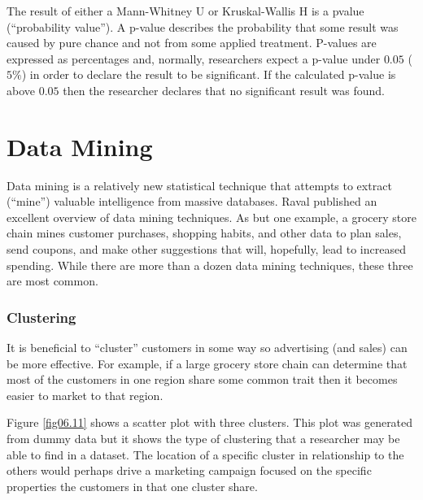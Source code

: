 The result of either a Mann-Whitney U or Kruskal-Wallis H is a \gls{pvalue} (``probability value''). A p-value describes the probability that some result was caused by pure chance and not from some applied treatment. P-values are expressed as percentages and, normally, researchers expect a p-value under $ 0.05 $ ($ 5\% $) in order to declare the result to be significant. If the calculated p-value is above $ 0.05 $ then the researcher declares that no significant result was found.

\section{Data Mining}

Data mining is a relatively new statistical technique that attempts to extract (``mine'') valuable intelligence from massive databases. Raval\cite{raval2012data} published an excellent overview of data mining techniques. As but one example, a grocery store chain mines customer purchases, shopping habits, and other data to plan sales, send coupons, and make other suggestions that will, hopefully, lead to increased spending. While there are more than a dozen data mining techniques, these three are most common.

\subsubsection{Clustering}

It is beneficial to ``cluster'' customers in some way so advertising (and sales) can be more effective. For example, if a large grocery store chain can determine that most of the customers in one region share some common trait then it becomes easier to market to that region.

Figure \ref{fig06.11} shows a scatter plot with three clusters. This plot was generated from dummy data but it shows the type of clustering that a researcher may be able to find in a dataset. The location of a specific cluster in relationship to the others would perhaps drive a marketing campaign focused on the specific properties the customers in that one cluster share.

